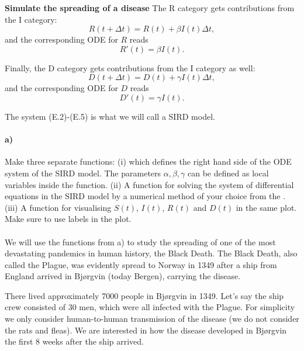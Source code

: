 \begin{Problem}{\textbf{Simulate the spreading of a disease}}
The R category gets contributions from the I category:
\begin{equation*}
   R(t + \Delta t) = R(t) + \beta I(t) \Delta t, 
\end{equation*}
and the corresponding ODE for $R$ reads
\begin{equation} \label{eq:4}
R'(t) = \beta I(t).
\end{equation}

Finally, the D category gets contributions from the I category as well:
\begin{equation*}
  D(t + \Delta t) = D(t) + \gamma I(t) \Delta t,  
\end{equation*}
and the corresponding ODE for $D$ reads
\begin{equation} \label{eq:5}
D'(t) = \gamma I (t).
\end{equation}

The system (E.2)-(E.5) is what we will call a SIRD model.

\paragraph{a)}
Make three separate functions: (i)  which defines the right hand side of the ODE system of the SIRD model. The parameters $\alpha, \beta, \gamma$ can be defined as local variables inside the function. (ii) A function  for solving the system of differential equations in the SIRD model by a numerical method of your choice from the . (iii) A function  for visualising $S(t)$, $I(t)$, $R(t)$ and $D(t)$ in the same plot. Make sure to use labels in the plot.

\paragraph{}  
We will use the functions from a) to study the spreading of one of the most devastating pandemics in human history, the Black Death. The Black Death, also called the Plague, was evidently spread to Norway in 1349 after a ship from England arrived in Bjørgvin (today Bergen), carrying the disease. 

There lived approximately 7000 people in Bjørgvin in 1349. \cite{berg} Let's say the ship crew consisted of 30 men, which were all infected with the Plague. For simplicity we only consider human-to-human transmission of the disease (we do not consider the rats and fleas). We are interested in how the disease developed in Bjørgvin the first 8 weeks after the ship arrived. 


\end{Problem}
